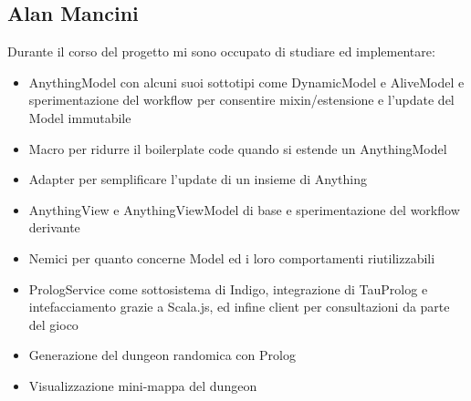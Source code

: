 \subsection{Alan Mancini}
Durante il corso del progetto mi sono occupato di studiare ed implementare:
\begin{itemize}
    \item AnythingModel con alcuni suoi sottotipi come DynamicModel e AliveModel e sperimentazione del workflow per consentire mixin/estensione e l'update del Model immutabile 
    \item Macro per ridurre il boilerplate code quando si estende un AnythingModel
    \item Adapter per semplificare l'update di un insieme di Anything
    \item AnythingView e AnythingViewModel di base e sperimentazione del workflow derivante
    \item Nemici per quanto concerne Model ed i loro comportamenti riutilizzabili
    \item PrologService come sottosistema di Indigo, integrazione di TauProlog e intefacciamento grazie a Scala.js, ed infine client per consultazioni da parte del gioco
    \item Generazione del dungeon randomica con Prolog
    \item Visualizzazione mini-mappa del dungeon
\end{itemize}
